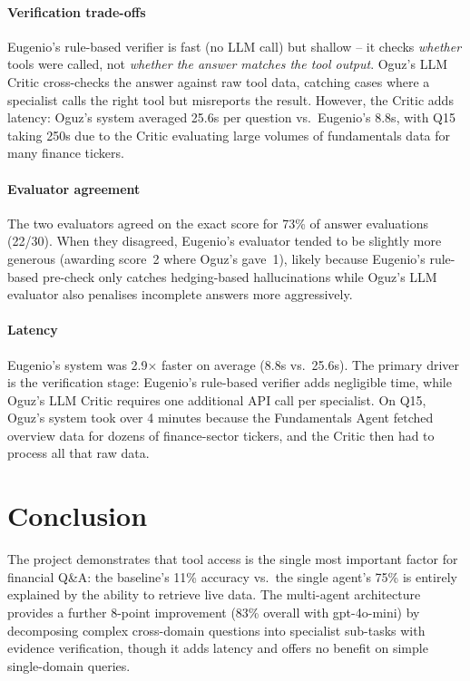 \documentclass[conference]{IEEEtran}
\begin{document}
\paragraph{Verification trade-offs}
Eugenio's rule-based verifier is fast (no LLM call) but shallow -- it checks \emph{whether}
tools were called, not \emph{whether the answer matches the tool output}.  Oguz's LLM
Critic cross-checks the answer against raw tool data, catching cases where a specialist
calls the right tool but misreports the result.  However, the Critic adds latency:
Oguz's system averaged 25.6s per question vs.\ Eugenio's 8.8s, with Q15 taking 250s
due to the Critic evaluating large volumes of fundamentals data for many finance tickers.

\paragraph{Evaluator agreement}
The two evaluators agreed on the exact score for 73\% of answer evaluations (22/30).
When they disagreed, Eugenio's evaluator tended to be slightly more generous (awarding
score~2 where Oguz's gave~1), likely because Eugenio's rule-based pre-check only catches
hedging-based hallucinations while Oguz's LLM evaluator also penalises incomplete answers
more aggressively.

\paragraph{Latency}
Eugenio's system was 2.9$\times$ faster on average (8.8s vs.\ 25.6s).  The primary
driver is the verification stage: Eugenio's rule-based verifier adds negligible time,
while Oguz's LLM Critic requires one additional API call per specialist.  On Q15, Oguz's
system took over 4 minutes because the Fundamentals Agent fetched overview data for
dozens of finance-sector tickers, and the Critic then had to process all that raw data.

\section{Conclusion}

The project demonstrates that tool access is the single most important factor for
financial Q\&A: the baseline's 11\% accuracy vs.\ the single agent's 75\% is entirely
explained by the ability to retrieve live data.  The multi-agent architecture provides
a further 8-point improvement (83\% overall with gpt-4o-mini) by decomposing complex
cross-domain questions into specialist sub-tasks with evidence verification, though it
adds latency and offers no benefit on simple single-domain queries.
\end{document}

